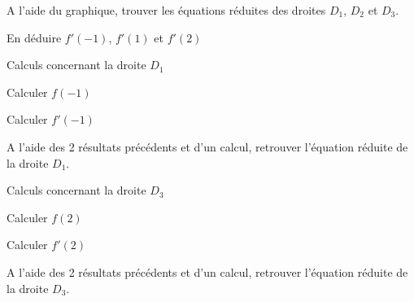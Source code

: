 \documentclass[12pt,a4paper]{article}  %
\begin{document}
\begin{enumMet}
	\item A l'aide du graphique, trouver les équations réduites des droites $D_1$, $D_2$ et $D_3$. %
	\item En déduire $f'(-1)$, $f'(1)$ et $f'(2)$ %
	\item Calculs concernant la droite $D_1$
	\begin{enumMet}
		\item Calculer $f(-1)$ %
		\item Calculer $f'(-1)$ %
		\item A l'aide des 2 résultats précédents et d'un calcul, retrouver l'équation réduite de la droite $D_1$. \quad %
	\end{enumMet}
	\item {} Calculs concernant la droite $D_3$
	\begin{enumMet}
		\item {} Calculer $f(2)$ %
		\item {} Calculer $f'(2)$ %
		\item {} A l'aide des 2 résultats précédents et d'un calcul, retrouver l'équation réduite de la droite $D_3$. %
	\end{enumMet}
	
\end{enumMet}
\end{document}
